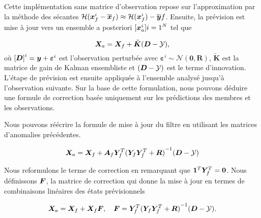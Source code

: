 Cette implémentation sans matrice d'observation repose sur l'approximation par la méthode des sécantes $\mathcal{H}(\bm{x}^i_f - \overline{\bm{x}}_f) \approx \mathcal{H} (\bm{x}^i_f) - \overline{\bm{y}}f$.
Ensuite, la prévision est mise à jour vers un ensemble a posteriori ${[\bm{x}^i_a]}{i=1}^{N}$ tel que

\begin{equation} \label{enkf_formula}
    \bm{X}_a = \bm{X}_f + \tilde{\bm{K}} ( \bm{D} - \mathcal{Y}),
\end{equation}
où ${[\bm{D}]}^i = \bm{y} + \bm{\varepsilon}^i$ est l'observation perturbée avec $\bm{\varepsilon}^i \sim \mathcal{N}(\bm{0}, \bm R) $, $\tilde{\bm{K}}$ est la matrice de gain de Kalman ensembliste et $( \bm{D} - \mathcal{Y})$ est le terme d'innovation.
L'étape de prévision est ensuite appliquée à l'ensemble analysé jusqu'à l'observation suivante.
Sur la base de cette formulation, nous pouvons déduire une formule de correction basée uniquement sur les prédictions des membres et les observations.

Nous pouvons réécrire la formule de mise à jour du filtre en utilisant les matrices d'anomalies précédentes.

\begin{equation*}
    \bm{X}_a = \bm{X}_f + \bm A_f \bm Y_f^T {({\bm Y_f \bm Y_f^T + \bm R})}^{-1}(\bm{D} - \mathcal{Y})
\end{equation*}

Nous reformulons le terme de correction en remarquant que $ \bm{1}^T \bm Y_f^T = \bm{0}$. Nous définissons $\bm{F}$, la matrice de correction qui donne la mise à jour en termes de combinaisons linéaires des états prévisionnels

\begin{equation}
    \bm{X}_a = \bm{X}_f + \bm{X}_f \bm{F}, \quad \bm{F} = \bm Y_f^T {(\bm Y_f \bm Y_f^T + \bm R)}^{-1}(\bm{D} - \mathcal{Y}).
\end{equation}




